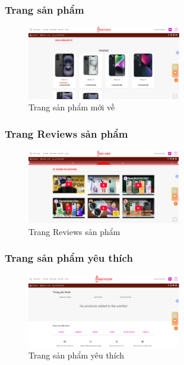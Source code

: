 \subsubsection{Trang sản phẩm}
\begin{figure}[H]
    \centering
    \includegraphics[width=0.6\textwidth]{img/sanphammoive.png}
    \caption{Trang sản phẩm mới về}
    \label{fig:moive}
\end{figure}


\subsubsection{Trang Reviews sản phẩm}
\begin{figure}[H]
    \centering
    \includegraphics[width=0.6\textwidth]{img/reviewsp.png}
    \caption{Trang Reviews sản phẩm }
    \label{fig:rv}
\end{figure}

\subsubsection{Trang sản phẩm yêu thích}
\begin{figure}[H]
    \centering
    \includegraphics[width=0.6\textwidth]{img/sanphamyeuthich.png}
    \caption{Trang sản phẩm yêu thích}
    \label{fig:yeu}
\end{figure}

